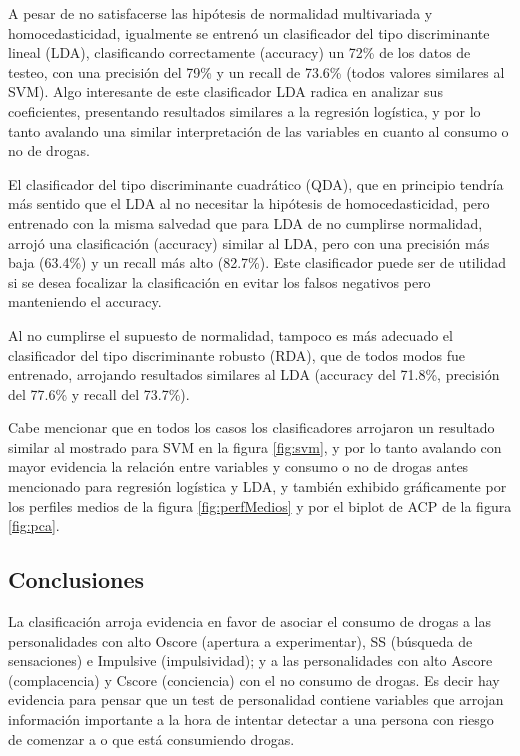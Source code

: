 \documentclass[a4paper,twocolumn]{article}
\begin{document}
A pesar de no satisfacerse las hipótesis de normalidad multivariada y homocedasticidad, igualmente se entrenó un clasificador del tipo discriminante lineal (LDA), clasificando correctamente (accuracy) un 72\% de los datos de testeo, con una precisión del 79\% y un recall de 73.6\% (todos valores similares al SVM). Algo interesante de este clasificador LDA radica en analizar sus coeficientes, presentando resultados similares a la regresión logística, y por lo tanto avalando una similar interpretación de las variables en cuanto al consumo o no de drogas.

El clasificador del tipo discriminante cuadrático (QDA), que en principio tendría más sentido que el LDA al no necesitar la hipótesis de homocedasticidad, pero entrenado con la misma salvedad que para LDA de no cumplirse normalidad, arrojó una clasificación (accuracy) similar al LDA, pero con una precisión más baja (63.4\%) y un recall más alto (82.7\%). Este clasificador puede ser de utilidad si se desea focalizar la clasificación en evitar los falsos negativos pero manteniendo el accuracy.

Al no cumplirse el supuesto de normalidad, tampoco es más adecuado el clasificador del tipo discriminante robusto (RDA), que de todos modos fue entrenado, arrojando resultados similares al LDA (accuracy del 71.8\%, precisión del 77.6\% y recall del 73.7\%). %

Cabe mencionar que en todos los casos los clasificadores arrojaron un resultado similar al mostrado para SVM en la figura \ref{fig:svm}, y por lo tanto avalando con mayor evidencia la relación entre variables y consumo o no de drogas antes mencionado para regresión logística y LDA, y también exhibido gráficamente por los perfiles medios de la figura \ref{fig:perfMedios} y por el biplot de ACP de la figura \ref{fig:pca}.

\subsection{Conclusiones}
La clasificación arroja evidencia en favor de asociar el consumo de drogas a las personalidades con alto Oscore (apertura a experimentar), SS (búsqueda de sensaciones) e Impulsive (impulsividad); y a las personalidades con alto Ascore (complacencia) y Cscore (conciencia) con el no consumo de drogas. Es decir hay evidencia para pensar que un test de personalidad contiene variables que arrojan información importante a la hora de intentar detectar a una persona con riesgo de comenzar a o que está consumiendo drogas.
\end{document}
